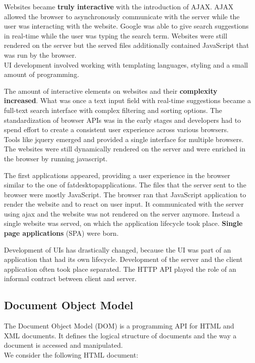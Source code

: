 Websites became \textbf{truly interactive} with the introduction of AJAX. AJAX allowed the browser to asynchronously communicate with the server while the user was interacting with the website. Google was able to give search suggestions in real-time while the user was typing the search term. Websites were still rendered on the server but the served files additionally contained JavaScript that was run by the browser.
\\ UI development involved working with templating languages, styling and a small amount of programming.

The amount of interactive elements on websites and their \textbf{complexity increased}. What was once a text input field with real-time suggestions became a full-text search interface with complex filtering and sorting options. The standardization of browser APIs was in the early stages and developers had to spend effort to create a consistent user experience across various browsers.
\\ Tools like \gls{jquery} emerged and provided a single interface for multiple browsers. The websites were still dynamically rendered on the server and were enriched in the browser by running \gls{javascript}.

The first applications appeared, providing a user experience in the browser similar to the one of \gls{fatdesktopapplications}. The files that the server sent to the browser were mostly JavaScript. The browser ran that JavaScript application to render the website and to react on user input. It communicated with the server using \gls{ajax} and the website was not rendered on the server anymore. Instead a single website was served, on which the application lifecycle took place. \textbf{Single page applications} (SPA) were born.
\par Development of UIs has drastically changed, because the UI was part of an application that had its own lifecycle. Development of the server and the client application often took place separated. The HTTP API played the role of an informal contract between client and server.

\subsection{Document Object Model}\label{documentobjectmodel}
The Document Object Model (DOM) is a programming API for HTML and XML documents. It defines the logical structure of documents and the way a document is accessed and manipulated. \citep{domintro} \\ We consider the following HTML document:


